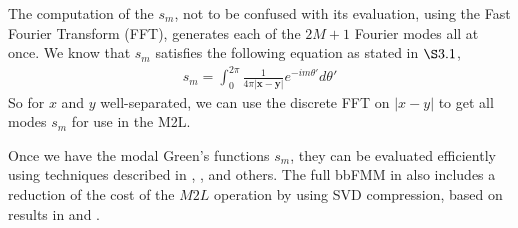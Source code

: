 \documentclass[11pt, oneside]{article}   	%
\begin{document}
The computation of the $s_m$, not to be confused with its evaluation, using the Fast Fourier Transform (FFT), generates each of the $2M+1$ Fourier modes all at once. We know that $s_m$ satisfies the following equation as stated in $\S3.1$,
\begin{align}
s_m = \int_0^{2\pi} \frac{1}{4\pi|\mathbf{x}-\mathbf{y}|}e^{-im\theta'}d\theta'
\end{align}
So for $x$ and $y$ well-separated, we can use the discrete FFT on $|x-y|$ to get all modes $s_m$ for use in the M2L.

Once we have the modal Green's functions $s_m$, they can be evaluated efficiently using techniques described in \cite{A}, \cite{VBT}, and others. The full bbFMM in \cite{FD} also includes a reduction of the cost of the $M2L$ operation by using SVD compression, based on results in \cite{CGMR} and \cite{MR}.
\end{document}
